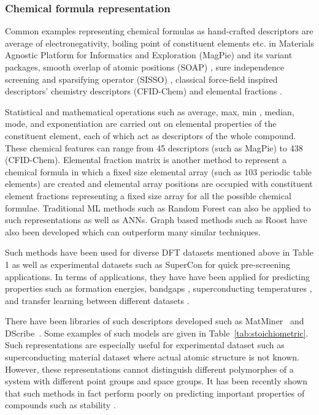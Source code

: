 \documentclass[pdflatex,sn-mathphys]{sn-jnl}%
\theoremstyle{thmstyleone}%
\theoremstyle{thmstyletwo}%
\theoremstyle{thmstylethree}%
\begin{document}
\subsubsection{Chemical formula representation}

Common examples representing chemical formulas as hand-crafted descriptors are average of electronegativity, boiling point of constituent elements etc. in Materials Agnostic Platform for Informatics and Exploration (MagPie) \cite{ward2016general} and its variant packages, smooth overlap of atomic positions (SOAP) \cite{de2016comparing}, sure independence screening and sparsifying operator (SISSO) \cite{ouyang2018sisso}, classical force-field inspired descriptors' chemistry descriptors (CFID-Chem) \cite{choudhary2018machine} and elemental fractions \cite{jha2018elemnet}. 

Statistical and mathematical operations such as average, max, min , median, mode, and exponentiation are carried out on elemental properties of the constituent element, each of which act as descriptors of the whole compound. These chemical features can range from 45 descriptors (such as MagPie) to 438 (CFID-Chem). Elemental fraction matrix is another method to represent a chemical formula in which a fixed size elemental array (such as 103 periodic table elements) are created and elemental array positions are occupied with constituent element fractions representing a fixed size array for all the possible chemical formulae. Traditional ML methods such as Random Forest can also be applied to such representations as well as ANNs. Graph based methods such as Roost have also been developed which can outperform many similar techniques.

Such methods have been used for diverse DFT datasets mentioned above in Table 1 as well as experimental datasets such as SuperCon \cite{stanev2018machine} for quick pre-screening applications. In terms of applications, they have have been applied for predicting properties such as formation energies, bandgaps \cite{jha2018elemnet}, superconducting temperatures \cite{stanev2018machine}, and transfer learning between different datasets \cite{jha2019enhancing}. 

There have been libraries of such descriptors developed such as MatMiner~\cite{ward2018matminer} and DScribe~\cite{himanen2020dscribe}. Some examples of such models are given in Table~\ref{tab:stoichiometric}. Such representations are especially useful for experimental dataset such as superconducting material dataset where actual atomic structure is not known. However, these representations cannot distinguish different polymorphes of a system with different point groups and space groups. It has been recently shown that such methods in fact perform poorly on predicting important properties of compounds such as stability \cite{bartel2020critical}.
\end{document}

